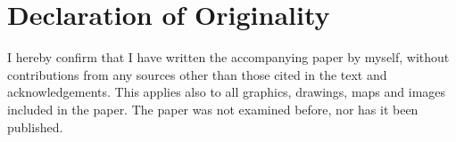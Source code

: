 \documentclass[conference]{IEEEtran}
\begin{document}
\newpage

\section{Declaration of Originality}
I hereby confirm that I have written the accompanying paper by myself, without contributions from any sources other than those cited in the text and acknowledgements.
This applies also to all graphics, drawings, maps and images included in the paper.
The paper was not examined before, nor has it been published.


 
\end{document}
